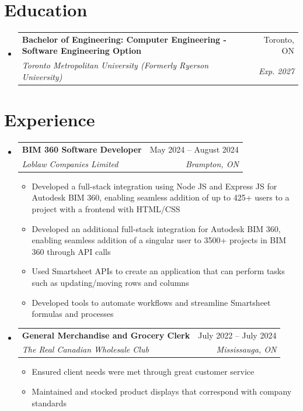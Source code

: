 \documentclass[letterpaper,11pt]{article}
\makeatletter
\newcommand{\resumeItem}[1]{
  \item\small{
    {#1 \vspace{-2pt}}
  }
}
\newcommand{\resumeSubheading}[4]{
  \vspace{-2pt}\item
    \begin{tabular*}{0.97\textwidth}[t]{l@{\extracolsep{\fill}}r}
      \textbf{#1} & #2 \\
      \textit{\small#3} & \textit{\small #4} \\
    \end{tabular*}\vspace{-7pt}
}
\newcommand{\resumeSubHeadingListStart}{\begin{itemize}[leftmargin=0.15in, label={}]}
\newcommand{\resumeSubHeadingListEnd}{\end{itemize}}
\newcommand{\resumeItemListStart}{\begin{itemize}}
\newcommand{\resumeItemListEnd}{\end{itemize}\vspace{-5pt}}
\makeatother
\begin{document}
\section{Education}
  \resumeSubHeadingListStart
    \resumeSubheading
      {Bachelor of Engineering: Computer Engineering - Software Engineering Option}{Toronto, ON}
      {Toronto Metropolitan University (Formerly Ryerson University)}{Exp. 2027}
  \resumeSubHeadingListEnd

\section{Experience}
  \resumeSubHeadingListStart
    \resumeSubheading
      {BIM 360 Software Developer}{May 2024 -- August 2024}
      {Loblaw Companies Limited}{Brampton, ON}
      \resumeItemListStart
        \resumeItem{Developed a full-stack integration using Node JS and Express JS for Autodesk BIM 360, enabling seamless addition of up to 425+ users to a project with a frontend with HTML/CSS}
        \resumeItem{Developed an additional full-stack integration for Autodesk BIM 360, enabling seamless addition of a singular user to 3500+ projects in BIM 360 through API calls}
        \resumeItem{Used Smartsheet APIs to create an application that can perform tasks such as updating/moving rows and columns}
        \resumeItem{Developed tools to automate workflows and streamline Smartsheet formulas and processes}
      \resumeItemListEnd
      
    \resumeSubheading
      {General Merchandise and Grocery Clerk}{July 2022 -- July 2024}
      {The Real Canadian Wholesale Club}{Mississauga, ON}
      \resumeItemListStart
        \resumeItem{Ensured client needs were met through great customer service}
        \resumeItem{Maintained and stocked product displays that correspond with company standards}
        \resumeItemListEnd

  \resumeSubHeadingListEnd


\end{document}
